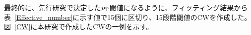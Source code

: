 
最終的に、先行研究\cite{article:shiomi-mron}で決定した$p_{\rm{T}}$閾値になるように、フィッティング結果から表~\ref{Effective_number}に示す値で15個に区切り、15段階閾値のCWを作成した。図~\ref{CW}に本研究で作成したCWの一例を示す。

